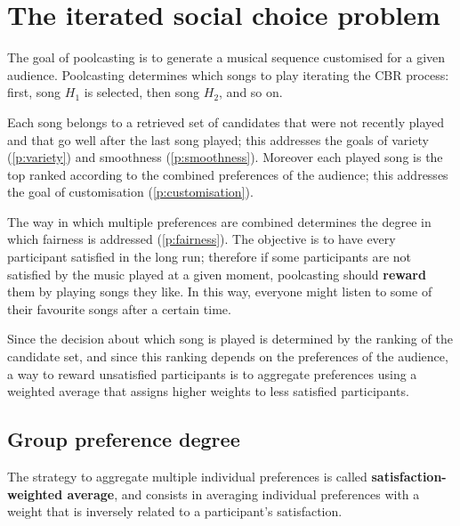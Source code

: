 
\section{The iterated social choice problem} %
\label{sec:social-choice-problem}



The goal of poolcasting is to generate a musical sequence customised for a given audience. 
Poolcasting determines which songs to play iterating the CBR process:
first, song $H_1$ is selected, then song $H_2$, and so on. 

Each song belongs to a retrieved set of candidates that were not recently played and that go well after the last song played; this addresses the goals of variety (\ref{p:variety}) and smoothness (\ref{p:smoothness}).
Moreover each played song is the top ranked according to the combined preferences of the audience; this addresses the goal of customisation (\ref{p:customisation}).

The way in which multiple preferences are combined determines the degree in which fairness is addressed (\ref{p:fairness}).
The objective is to have every participant satisfied in the long run;
therefore if some participants are not satisfied by the music played at a given moment, poolcasting should \textbf{reward} them by playing songs they like.
In this way, everyone might listen to some of their favourite songs after a certain time.

Since the decision about which song is played is determined by the ranking of the candidate set, and since this ranking depends on the preferences of the audience, a way to reward unsatisfied participants is to aggregate preferences using a weighted average that assigns higher weights to less satisfied participants.


\subsection{Group preference degree} %
\label{sub:the_group_preference_degree}

The strategy to aggregate multiple individual preferences is called \textbf{satisfaction-weighted average}, and consists in averaging individual preferences with a weight that is inversely related to a participant's satisfaction. 

